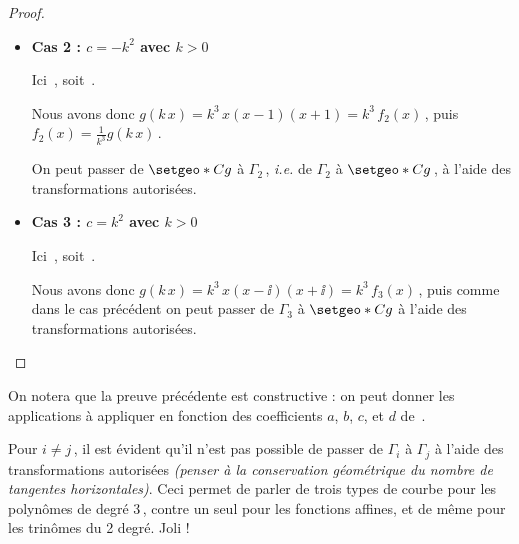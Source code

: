 \begin{proof}
\begin{enumerate}
\begin{itemize}


		\item \textbf{Cas 2 : $c = - k^2$ avec $k > 0$}
		
		\smallskip
		\noindent
		Ici
		\,,
		soit
		\,.
		
		\smallskip
		\noindent
		Nous avons donc $g(k \, x) = k^3 \, x(x - 1)(x + 1) = k^3 \, f_2(x)$\,,
		puis
		$f_2(x) = \frac{1}{k^3} g(k \, x)$\,.
		
		\smallskip
		\noindent
		On peut passer de $\setgeo*{C}{g}$ à $\Gamma_2$\,, \emph{i.e.} de $\Gamma_2$ à $\setgeo*{C}{g}$\,, à l'aide des transformations autorisées.




		\item \textbf{Cas 3 : $c = k^2$ avec $k > 0$}
		
		\smallskip
		\noindent
		Ici
		\,,
		soit
		\,.
		
		\smallskip
		\noindent
		Nous avons donc $g(k \, x) = k^3 \, x(x - \ii)(x + \ii) = k^3 \, f_3(x)$\,,
		puis comme dans le cas précédent on peut passer de $\Gamma_3$ à $\setgeo*{C}{g}$ à l'aide des transformations autorisées.
		\end{itemize}
	\end{enumerate}
\end{proof}




\begin{remark}
	On notera que la preuve précédente est constructive : on peut donner les applications à appliquer en fonction des coefficients $a$, $b$, $c$, et $d$ de \,.
\end{remark}




\medskip

Pour $i \neq j$\,, il est évident qu'il n'est pas possible de passer de $\Gamma_i$  à $\Gamma_j$ à l'aide des transformations autorisées \emph{(penser à la conservation géométrique du nombre de tangentes horizontales)}.
Ceci permet de parler de trois types de courbe pour les polynômes de degré $3$\,, contre un seul pour les fonctions affines, et de même pour les trinômes du 2\ieme{} degré. Joli !
